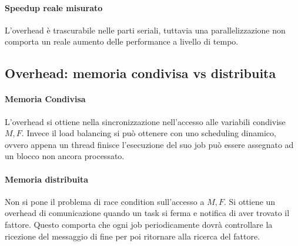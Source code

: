 \documentclass[11pt,a4paper]{article}
\begin{document}
\paragraph{Speedup reale misurato} L'overhead è trascurabile nelle parti seriali, tuttavia una parallelizzazione non comporta un reale aumento delle performance a livello di tempo.

\subsection{Overhead: memoria condivisa vs distribuita}

\paragraph{Memoria Condivisa}
L'overhead si ottiene nella sincronizzazione nell'accesso alle variabili condivise $M,F$.
Invece il load balancing si può ottenere con uno scheduling dinamico, ovvero appena un thread finisce l'esecuzione del suo job può essere assegnato ad un blocco non ancora processato.

\paragraph{Memoria distribuita}
Non si pone il problema di race condition sull'accesso a $M,F$.
Si ottiene un overhead di comunicazione quando un task si ferma e notifica di aver trovato il fattore.
Questo comporta che ogni job periodicamente dovrà controllare la ricezione del messaggio di fine per poi ritornare alla ricerca del fattore.
\end{document}
